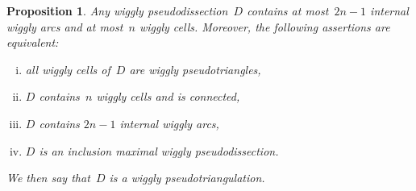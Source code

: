 \documentclass{amsart}
\newtheorem{proposition}[theorem]{Proposition}
\theoremstyle{definition}
\newcommand{\darkblue}{\color{darkblue}} %
\newcommand{\defn}[1]{\textsl{\darkblue #1}} %
\begin{document}
\begin{proposition}
\label{prop:wigglyPseudotriangulations}
Any wiggly pseudodissection~$D$ contains at most~$2n-1$ internal wiggly arcs and at most~$n$ wiggly cells.
Moreover, the following assertions are equivalent:
\begin{enumerate}[(i)]
\item all wiggly cells of~$D$ are wiggly pseudotriangles,
\item $D$ contains~$n$ wiggly cells and is connected,
\item $D$ contains $2n-1$ internal wiggly arcs,
\item $D$ is an inclusion maximal wiggly pseudodissection.
\end{enumerate}
We then say that~$D$ is a \defn{wiggly pseudotriangulation}.
\end{proposition}
\end{document}
